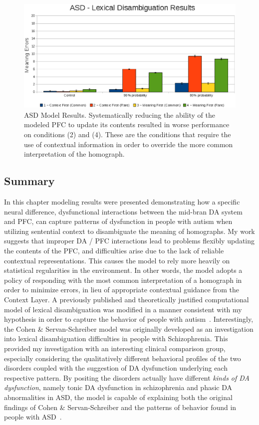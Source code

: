 \begin{figure}[tp]
\begin{center}
	\includegraphics[width=140mm]{graphs/asd_lexamb_results.eps}
\end{center}
\caption{ASD Model Results. Systematically reducing the ability of the modeled PFC to update its contents resulted in worse performance on conditions (2) and (4).  These are the conditions that require the use of contextual information in order to override the more common interpretation of the homograph. } 
\label{ASD-Amb-Results}
\end{figure} 

\subsection{Summary}
In this chapter modeling results were presented demonstrating how a specific neural difference, dysfunctional interactions between the mid-bran DA system and PFC, can capture patterns of dysfunction in people with autism when utilizing sentential context to disambiguate the meaning of homographs.  My work suggests that improper DA / PFC interactions lead to problems flexibly updating the contents of the PFC, and difficulties arise due to the lack of reliable contextual representations.  This causes the model to rely more heavily on statistical regularities in the environment.  In other words, the model adopts a policy of responding with the most common interpretation of a homograph in order to minimize errors, in lieu of appropriate contextual guidance from the Context Layer.  A previously published and theoretically justified computational model of lexical disambiguation was modified in a manner consistent with my hypothesis in order to capture the behavior of people with autism~\cite{CohenJD:1992:Schizophrenia}.  Interestingly, the Cohen \& Servan-Schreiber model was originally developed as an investigation into lexical disambiguation difficulties in people with Schizophrenia.  This provided my investigation with an interesting clinical comparison group, especially considering the qualitatively different behavioral profiles of the two disorders coupled with the suggestion of DA dysfunction underlying each respective pattern.  By positing the disorders actually have different \emph{kinds of DA dysfunction}, namely tonic DA dysfunction in schizophrenia and phasic DA abnormalities in ASD, the model is capable of explaining both the original findings of Cohen \& Servan-Schreiber and the patterns of behavior found in people with ASD~\cite{RefWorks:103,HappeF:1997:WCC_Homographs}.  

